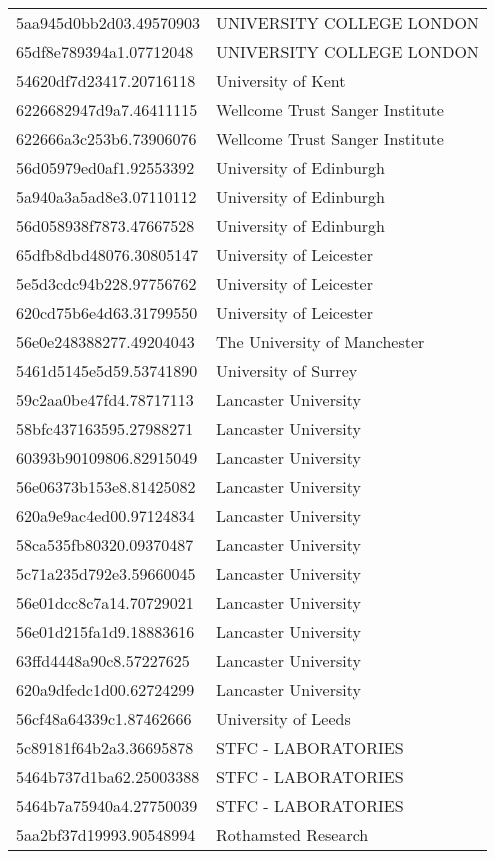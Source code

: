 \begin{tabular}{ll}
5aa945d0bb2d03.49570903 & UNIVERSITY COLLEGE LONDON \\
65df8e789394a1.07712048 & UNIVERSITY COLLEGE LONDON \\
54620df7d23417.20716118 & University of Kent \\
6226682947d9a7.46411115 & Wellcome Trust Sanger Institute \\
622666a3c253b6.73906076 & Wellcome Trust Sanger Institute \\
56d05979ed0af1.92553392 & University of Edinburgh \\
5a940a3a5ad8e3.07110112 & University of Edinburgh \\
56d058938f7873.47667528 & University of Edinburgh \\
65dfb8dbd48076.30805147 & University of Leicester \\
5e5d3cdc94b228.97756762 & University of Leicester \\
620cd75b6e4d63.31799550 & University of Leicester \\
56e0e248388277.49204043 & The University of Manchester \\
5461d5145e5d59.53741890 & University of Surrey \\
59c2aa0be47fd4.78717113 & Lancaster University \\
58bfc437163595.27988271 & Lancaster University \\
60393b90109806.82915049 & Lancaster University \\
56e06373b153e8.81425082 & Lancaster University \\
620a9e9ac4ed00.97124834 & Lancaster University \\
58ca535fb80320.09370487 & Lancaster University \\
5c71a235d792e3.59660045 & Lancaster University \\
56e01dcc8c7a14.70729021 & Lancaster University \\
56e01d215fa1d9.18883616 & Lancaster University \\
63ffd4448a90c8.57227625 & Lancaster University \\
620a9dfedc1d00.62724299 & Lancaster University \\
56cf48a64339c1.87462666 & University of Leeds \\
5c89181f64b2a3.36695878 & STFC - LABORATORIES \\
5464b737d1ba62.25003388 & STFC - LABORATORIES \\
5464b7a75940a4.27750039 & STFC - LABORATORIES \\
5aa2bf37d19993.90548994 & Rothamsted Research \\

\end{tabular}
